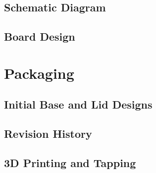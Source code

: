 \documentclass[
10pt, %
a4paper, %
oneside, %
headinclude,footinclude, %
BCOR5mm, %
]{scrartcl}
\begin{document}

\subsection{Schematic Diagram}


\subsection{Board Design}


\section{Packaging}


\subsection{Initial Base and Lid Designs}


\subsection{Revision History}


\subsection{3D Printing and Tapping}


\renewcommand{\refname}{\spacedlowsmallcaps{References}} %




\end{document}
